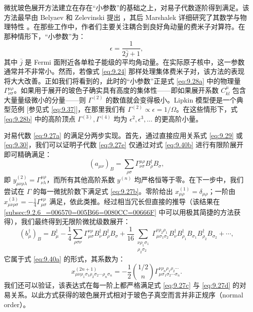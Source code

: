 微扰玻色展开方法建立在存在“小参数”的基础之上，对易子代数逐阶得到满足。该方法最早由 Belyaev 和 Zelevinski 提出
\cite{BZ62}，其后 Marshalek 详细研究了其数学与物理特性 \cite{Ma71,MH72,Ma74}。在那些工作中，作者们主要关注耦合到良好角动量的费米子对算符。在那种情形下，“小参数”为：
\begin{equation}
\epsilon=\frac{1}{2\bar{j}+1},\label{eq:9.41}
\end{equation}
其中 $\bar{j}$ 是 Fermi 面附近各单粒子能级的平均角动量。在实际原子核中，这一参数通常并不非常小。然而，若像式 \ref{eq:9.24}
那样处理集体费米子对，该方法的表现将大大改善。正如我们将看到的，此时的“小参数”正是式 \ref{eq:9.28a} 中的物理量
$\Gamma^{\mu\rho}_{\nu\sigma}$。如果用于展开的玻色子确实具有高度的集体性——即如果展开系数 $C^{\mu}_{kl}$
包含大量量级微小的分量——则 $\Gamma^{(2)}$ 的数值就会变得极小。Lipkin 模型便是一个典型范例 {[}参见式
\ref{eq:9.37}{]}，在那里我们有 $\Gamma^{(2)}\propto\epsilon=1/\Omega$。在这些情形下，式
\ref{eq:9.28b} 中的高阶顶点 $\Gamma^{(3)},\Gamma^{(4)}$ 均为 $\epsilon^{2},\epsilon^{3},\ldots$
的更高阶小量。

对易代数 \ref{eq:9.27a} 的满足分两步实现。首先，通过直接应用关系式 \ref{eq:9.29} 或 \ref{eq:9.30}，我们可以证明子代数
\ref{eq:9.27e} 仅通过对式 \ref{eq:9.40b} 进行有限阶展开即可精确满足：
\begin{equation}
(a_{\mu\nu})_{B}=\sum_{\rho\sigma}\Gamma^{\mu\rho}_{\nu\sigma}B^{\dagger}_{\rho}B_{\sigma},\label{eq:9.42}
\end{equation}
即 $y^{(2)}_{\mu\nu\rho\lambda}=\Gamma^{\mu\rho}_{\nu\lambda}$，而所有其他高阶系数
$y^{(n)}$ 均严格恒等于零。在下一步中，我们尝试在 $\Gamma$ 的每一微扰阶数下满足式 \ref{eq:9.27b}。零阶给出
$x^{(1)}_{\mu\rho}=\delta_{\mu\rho}$；一阶由 $x^{(3)}_{\mu\nu\rho\sigma}=-\frac{1}{4}\Gamma^{\nu\rho}_{\mu\sigma}$
满足，依此类推。经过相当冗长但直接的推导（该结果在 \ref{subsec:9.2.6_=006570=005B66=0080CC=00666F}
中可以用极其简捷的方法获得），我们最终得到无限阶微扰级数展开：
\begin{equation}
(b^{\dagger}_{\mu})_{B}=B^{\dagger}_{\mu}-\frac{1}{4}\sum_{\rho\sigma\nu}\Gamma^{\nu\rho}_{\mu\sigma}B^{\dagger}_{\nu}B^{\dagger}_{\rho}B_{\sigma}+\frac{1}{16}\sum_{\substack{\nu\rho_{1}\sigma_{1}\\
\rho_{2}\sigma_{2}
}
}\Gamma^{\nu\rho_{2}\rho_{1}}_{\mu\sigma_{1}\sigma_{2}}B^{\dagger}_{\nu}B^{\dagger}_{\rho_{1}}B_{\sigma_{1}}B^{\dagger}_{\rho_{2}}B_{\sigma_{2}}+\cdots,\label{eq:9.43}
\end{equation}
它属于式 \ref{eq:9.40a} 的形式，其系数为：
\begin{equation}
x^{(2n+1)}_{\mu\nu\rho_{1}\sigma_{1}\rho_{2}\sigma_{2}\cdots\rho_{n}\sigma_{n}}=-\frac{1}{2}\binom{1/2}{n}\Gamma^{\nu\rho_{n}\rho_{1}\rho_{2}\cdots}_{\mu\sigma_{1}\sigma_{2}\cdots\sigma_{n}}.\label{eq:9.44}
\end{equation}
我们还可以验证，该表达式在每一阶上都严格满足式 \ref{eq:9.27c} 与 \ref{eq:9.27d} 的对易关系。以此方式获得的玻色展开式相对于玻色子真空而言并非正规序（normal
order）。

